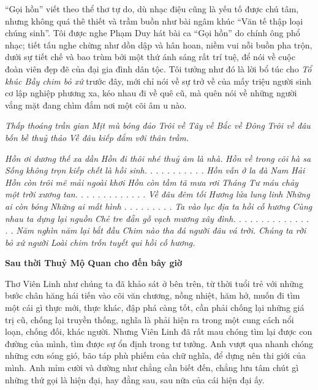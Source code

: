 \documentclass[../main.tex]{subfiles}
\begin{document}
\begin{multicols}{2}
“Gọi hồn” viết theo thể thơ tự do, dù nhạc điệu cũng là yếu tố được chú tâm, nhưng không quá thê thiết và trầm buồn như bài ngâm khúc “Văn tế thập loại chúng sinh”. Tôi được nghe Phạm Duy hát bài ca “Gọi hồn” do chính ông phổ nhạc; tiết tấu nghe chừng như dồn dập và hân hoan, niềm vui nỗi buồn pha trộn, dưới sự tiết chế và bao trùm bởi một thứ ánh sáng rất trí tuệ, để nói về cuộc đoàn viên đẹp đẽ của đại gia đình dân tộc. Tôi tưởng như đó là lời bổ túc cho \textit{Tổ khúc Bầy chim bỏ xứ} trước đây, mới chỉ nói về sự trở về của mấy triệu người sinh cơ lập nghiệp phương xa, kéo nhau đi về quê cũ, mà quên nói về những người vắng mặt đang chìm đắm nơi một cõi âm u nào. 

\textit{Thấp thoáng trần gian} 
\textit{Mịt mù bóng đảo} 
\textit{Trôi về Tây về Bắc về Đông} 
\textit{Trôi về đâu bốn bề thuỷ thảo} 
\textit{Về đâu kiếp đắm với thân trầm.} 

\textit{Hồn ơi dương thế xa dần} 
\textit{Hồn đi thôi nhé thuỷ âm là nhà.} 
\textit{Hồn về trong cõi hà sa} 
\textit{Sống không trọn kiếp chết là hồi sinh.} 
\textit{. . . . .} 
\textit{. . . . .} 
\textit{Hồn vẫn ở la đà Nam Hải} 
\textit{Hồn còn trôi mê mải ngoài khơi} 
\textit{Hồn còn tầm tã mưa rơi} 
\textit{Tháng Tư máu chảy một trời xương tan.} 
\textit{. . .} 
\textit{. . .} 
\textit{. . .} 
\textit{. . .} 
\textit{Về đâu đêm tối} 
\textit{Hương lửa lung linh} 
\textit{Những ai còn bóng} 
\textit{Những ai mất hình} 
\textit{. . .} 
\textit{. . .} 
\textit{. . .} 
\textit{Ta vào lục địa ta hồi cố hương} 
\textit{Cùng nhau ta dựng lại nguồn} 
\textit{Chẻ tre đẵn gỗ vạch mương xây đình.} 
\textit{. . .} 
\textit{. . .} 
\textit{. . .} 
\textit{. . .} 
\textit{. . .} 
\textit{Năm nghìn năm lại bắt đầu} 
\textit{Chim nào tha đá người đâu vá trời.} 
\textit{Chúng ta rời bỏ xứ người} 
\textit{Loài chim trốn tuyết qui hồi cố hương.} 


\textbf{Sau thời Thuỷ Mộ Quan cho đến bây giờ }

Thơ Viên Linh như chúng ta đã khảo sát ở bên trên, từ thời tuổi trẻ với những bước chân hăng hái tiến vào cõi văn chương, nồng nhiệt, hăm hở, muốn đi tìm một cái gì thực mới, thực khác, đập phá càng tốt, cần phải chống lại những giá trị cũ, chống lại truyền thống, nghĩa là phải hiện ra trong một cung cách nổi loạn, chống đối, khác người. Nhưng Viên Linh đã rất mau chóng tìm lại được con đường của mình, tìm được sự ổn định trong tư tưởng. Anh vượt qua nhanh chóng những cơn sóng gió, bão táp phù phiếm của chữ nghĩa, để dựng nên thi giới của mình. Anh mỉm cười và dường như chẳng cần biết đến, chẳng lưu tâm chút gì những thứ gọi là hiện đại, hay đằng sau, sau nữa của cái hiện đại ấy. 


\end{multicols}
\end{document}
